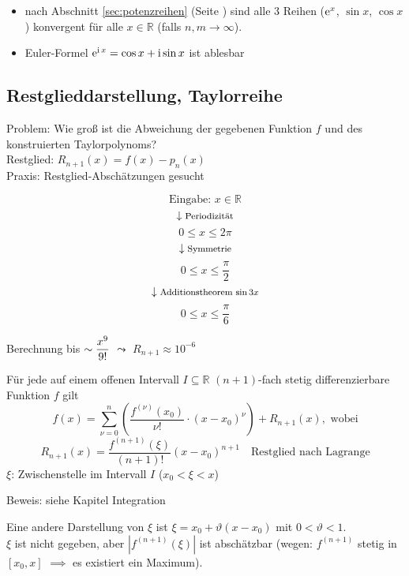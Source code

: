 \begin{note}
  \begin{itemize}
    \item nach Abschnitt \ref{sec:potenzreihen} (Seite \pageref{sec:potenzreihen}) sind alle 3 Reihen ($\operatorname{e}^x$, $\sin x$, $\cos x$) konvergent für alle $x \in \mathbb{R}$ (falls $n, m \rightarrow \infty$).
    \item Euler-Formel $\operatorname{e}^{\operatorname{i} x} = \cos x + \operatorname{i} \sin x$ ist ablesbar
  \end{itemize}
\end{note}

\subsection{Restglieddarstellung, Taylorreihe}

Problem: Wie groß ist die Abweichung der gegebenen Funktion $f$ und des konstruierten Taylorpolynoms?\\
Restglied: $R_{n+1}(x) = f(x) - p_n(x)$\\
Praxis: Restglied-Abschätzungen gesucht
%
\begin{example}
  \[ \text{Eingabe: } x \in \mathbb{R} \]
  \[ \downarrow \text{\footnotesize Periodizität} \]
  \[ 0 \leq x \leq 2 \pi \]
  \[ \downarrow \text{\footnotesize Symmetrie} \]
  \[ 0 \leq x \leq \frac \pi 2 \]
  \[ \downarrow \text{\footnotesize Additionstheorem $\sin 3x$} \]
  \[ 0 \leq x \leq \frac \pi 6 \]
  \begin{center} Berechnung bis $\sim\displaystyle \frac{x^9}{9!}$ $\leadsto$ $R_{n+1} \approx 10^{-6}$ \end{center}
\end{example}

\begin{theorem}[Taylorformel]
  Für jede auf einem offenen Intervall $I \subseteq \mathbb{R}$ $(n+1)$-fach stetig differenzierbare Funktion $f$ gilt
  \[ f(x) = \sum_{\nu = 0}^n \left( \frac{f^{(\nu)}(x_0)}{\nu !} \cdot (x - x_0)^\nu \right) + R_{n+1}(x), \text{ wobei}\]
  \[ R_{n+1}(x) = \frac{f^{(n+1)}(\xi)}{(n+1)!} (x-x_0)^{n+1} \quad\text{Restglied nach Lagrange}\]
  $\xi$: Zwischenstelle im Intervall $I$ ($x_0 < \xi < x$)
\end{theorem}

\noindent Beweis: siehe Kapitel Integration

\begin{note}
  Eine andere Darstellung von $\xi$ ist $\xi = x_0 + \vartheta (x - x_0)$ mit $0 < \vartheta < 1$.\\
  $\xi$ ist nicht gegeben, aber $\left| f^{(n+1)}(\xi)\right|$ ist abschätzbar (wegen: $f^{(n+1)}$ stetig in $[x_0,x]$ $\implies$ es existiert ein Maximum).
\end{note}


